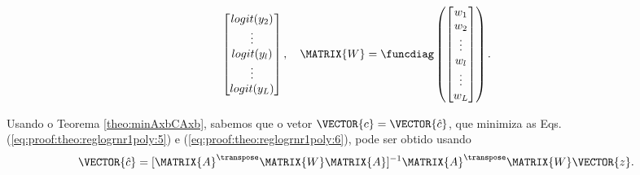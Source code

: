 \begin{myproofT}
\begin{equation}
\begin{bmatrix}
logit(y_2)  \\
\vdots  \\
logit(y_l)  \\
\vdots \\
logit(y_L) \\
\end{bmatrix},
\quad
\MATRIX{W}=
\funcdiag \left(
\begin{bmatrix}
w_1  \\
w_2  \\
\vdots  \\
w_l  \\
\vdots \\
w_L \\
\end{bmatrix} \right).
\end{equation}


Usando o Teorema \ref{theo:minAxbCAxb}, sabemos que o vetor $\VECTOR{c}=\VECTOR{\hat{c}}$,
que minimiza as Eqs. (\ref{eq:proof:theo:reglogrnr1poly:5}) e (\ref{eq:proof:theo:reglogrnr1poly:6}), 
pode ser obtido usando 
\begin{equation}\label{eq:proof:theo:reglogrnr1poly:8}
\VECTOR{\hat{c}}=[\MATRIX{A}^{\transpose}\MATRIX{W}\MATRIX{A}]^{-1}\MATRIX{A}^{\transpose}\MATRIX{W}\VECTOR{z}.
\end{equation}
\end{myproofT}


